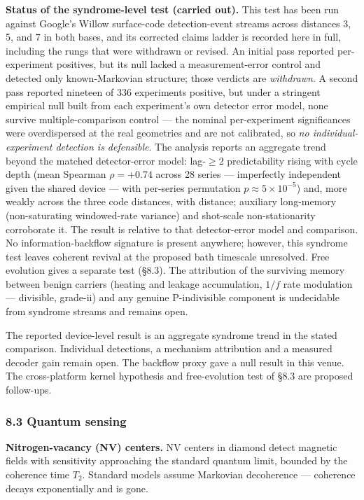 \documentclass[
]{article}
\begin{document}
\textbf{Status of the syndrome-level test (carried out).} This test has
been run against Google's Willow surface-code detection-event streams
across distances 3, 5, and 7 in both bases, and its corrected claims
ladder is recorded here in full, including the rungs that were withdrawn
or revised. An initial pass reported per-experiment positives, but its
null lacked a measurement-error control and detected only
known-Markovian structure; those verdicts are \emph{withdrawn}. A second
pass reported nineteen of 336 experiments positive, but under a
stringent empirical null built from each experiment's own detector error
model, none survive multiple-comparison control --- the nominal
per-experiment significances were overdispersed at the real geometries
and are not calibrated, so \emph{no individual-experiment detection is
defensible}. The analysis reports an aggregate trend beyond the matched
detector-error model: lag-\(\geq 2\) predictability rising with cycle
depth (mean Spearman \(\rho = +0.74\) across 28 series --- imperfectly
independent given the shared device --- with per-series permutation
\(p \approx 5\times10^{-5}\)) and, more weakly across the three code
distances, with distance; auxiliary long-memory (non-saturating
windowed-rate variance) and shot-scale non-stationarity corroborate it.
The result is relative to that detector-error model and comparison. No
information-backflow signature is present anywhere; however, this
syndrome test leaves coherent revival at the proposed bath timescale
unresolved. Free evolution gives a separate test (§8.3). The attribution
of the surviving memory between benign carriers (heating and leakage
accumulation, \(1/f\) rate modulation --- divisible, grade-ii) and any
genuine P-indivisible component is undecidable from syndrome streams and
remains open.

The reported device-level result is an aggregate syndrome trend in the
stated comparison. Individual detections, a mechanism attribution and a
measured decoder gain remain open. The backflow proxy gave a null result
in this venue. The cross-platform kernel hypothesis and free-evolution
test of §8.3 are proposed follow-ups.

\hypertarget{quantum-sensing}{%
\subsubsection{8.3 Quantum sensing}\label{quantum-sensing}}

\textbf{Nitrogen-vacancy (NV) centers.} NV centers in diamond detect
magnetic fields with sensitivity approaching the standard quantum limit,
bounded by the coherence time \(T_2\). Standard models assume Markovian
decoherence --- coherence decays exponentially and is gone.
\end{document}
